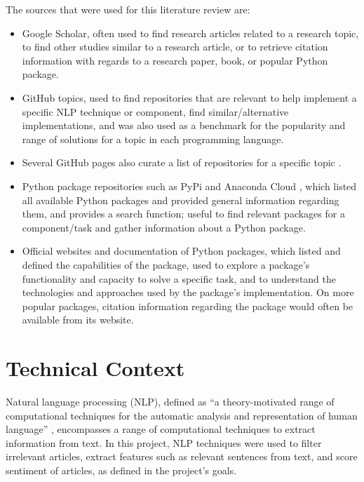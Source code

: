 \documentclass{report}
\begin{document}
The sources that were used for this literature review are:
\begin{itemize}
	\item Google Scholar, often used to find research articles related to a research topic, to find other studies similar to a research article, or to retrieve citation information with regards to a research paper, book, or popular Python package.
	\item GitHub topics, used to find repositories that are relevant to help implement a specific NLP technique or component, find similar/alternative implementations, and was also used as a benchmark for the popularity and range of solutions for a topic in each programming language.
	\item Several GitHub pages also curate a list of repositories for a specific topic \cite{awesome-sentiment-analysis, awesome-nlp, awesome-machine-learning}.
	\item Python package repositories such as PyPi \cite{PyPi} and Anaconda Cloud \cite{Anaconda-Cloud}, which listed all available Python packages and provided general information regarding them, and provides a search function; useful to find relevant packages for a component/task and gather information about a Python package.
	\item Official websites and documentation of Python packages, which listed and defined the capabilities of the package, used to explore a package's functionality and capacity to solve a specific task, and to understand the technologies and approaches used by the package's implementation. 
		On more popular packages, citation information regarding the package would often be available from its website.
\end{itemize}

\section{Technical Context} \label{Technical Context}  %

Natural language processing (NLP), defined as ``a theory-motivated range of computational techniques for the automatic analysis and representation of human language'' \cite{cambria2014jumping}, encompasses a range of computational techniques to extract information from text.
In this project, NLP techniques were used to filter irrelevant articles, extract features such as relevant sentences from text, and score sentiment of articles, as defined in the project's goals.
\end{document}
